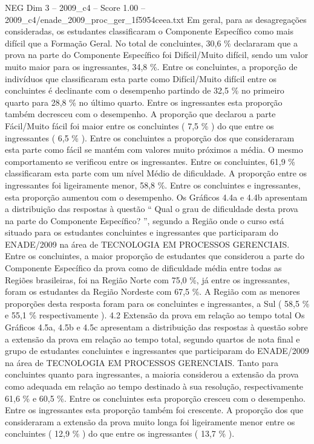 \begin{textsample}{NEG Dim 3 – 2009\_c4 – Score 1.00 – 2009\_c4/enade\_2009\_proc\_ger\_1f5954ceea.txt}
Em geral, para as desagregações consideradas, os estudantes classificaram o Componente Específico como mais difícil que a Formação Geral.
No total de concluintes, 30,6 \% declararam que a prova na parte do Componente Específico foi Difícil/Muito difícil, sendo um valor muito maior para os ingressantes, 34,8 \%.
Entre os concluintes, a proporção de indivíduos que classificaram esta parte como Difícil/Muito difícil entre os concluintes é declinante com o desempenho partindo de 32,5 \% no primeiro quarto para 28,8 \% no último quarto.
Entre os ingressantes esta proporção também decresceu com o desempenho.
A proporção que declarou a parte Fácil/Muito fácil foi maior entre os concluintes ( 7,5 \% ) do que entre os ingressantes ( 6,5 \% ).
Entre os concluintes a proporção dos que consideraram esta parte como fácil se mantém com valores muito próximos a média.
O mesmo comportamento se verificou entre os ingressantes.
Entre os concluintes, 61,9 \% classificaram esta parte com um nível Médio de dificuldade.
A proporção entre os ingressantes foi ligeiramente menor, 58,8 \%.
Entre os concluintes e ingressantes, esta proporção aumentou com o desempenho.
Os Gráficos 4.4a e 4.4b apresentam a distribuição das respostas à questão “ Qual o grau de dificuldade desta prova na parte do Componente Específico? ”, segundo a Região onde o curso está situado para os estudantes concluintes e ingressantes que participaram do ENADE/2009 na área de TECNOLOGIA EM PROCESSOS GERENCIAIS.
Entre os concluintes, a maior proporção de estudantes que considerou a parte do Componente Específico da prova como de dificuldade média entre todas as Regiões brasileiras, foi na Região Norte com 75,0 \%, já entre os ingressantes, foram os estudantes da Região Nordeste com 67,5 \%.
A Região com as menores proporções desta resposta foram para os concluintes e ingressantes, a Sul ( 58,5 \% e 55,1 \% respectivamente ). 4.2 Extensão da prova em relação ao tempo total Os Gráficos 4.5a, 4.5b e 4.5c apresentam a distribuição das respostas à questão sobre a extensão da prova em relação ao tempo total, segundo quartos de nota final e grupo de estudantes concluintes e ingressantes que participaram do ENADE/2009 na área de TECNOLOGIA EM PROCESSOS GERENCIAIS.
Tanto para concluintes quanto para ingressantes, a maioria considerou a extensão da prova como adequada em relação ao tempo destinado à sua resolução, respectivamente 61,6 \% e 60,5 \%.
Entre os concluintes esta proporção cresceu com o desempenho.
Entre os ingressantes esta proporção também foi crescente.
A proporção dos que consideraram a extensão da prova muito longa foi ligeiramente menor entre os concluintes ( 12,9 \% ) do que entre os ingressantes ( 13,7 \% ).

\end{textsample}
